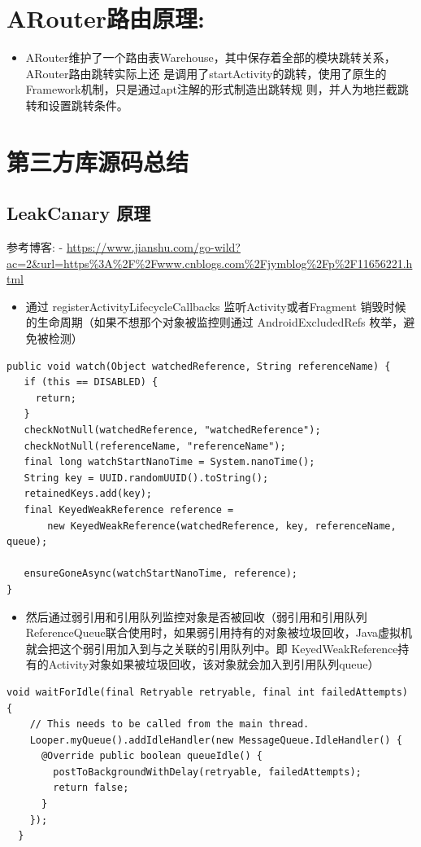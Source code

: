 \documentclass[9pt, b5paper]{article}
\begin{document}
\section{ARouter路由原理:}
\label{sec-8}
\begin{itemize}
\item ARouter维护了一个路由表Warehouse，其中保存着全部的模块跳转关系，ARouter路由跳转实际上还 是调用了startActivity的跳转，使用了原生的Framework机制，只是通过apt注解的形式制造出跳转规 则，并人为地拦截跳转和设置跳转条件。
\end{itemize}

\section{第三方库源码总结}
\label{sec-9}
\subsection{LeakCanary 原理}
\label{sec-9-1}
参考博客: - \url{https://www.jianshu.com/go-wild?ac=2&url=https\%3A\%2F\%2Fwww.cnblogs.com\%2Fjymblog\%2Fp\%2F11656221.html}
\begin{itemize}
\item 通过 registerActivityLifecycleCallbacks 监听Activity或者Fragment 销毁时候的生命周期（如果不想那个对象被监控则通过 AndroidExcludedRefs 枚举，避免被检测）
\end{itemize}
\begin{verbatim}
public void watch(Object watchedReference, String referenceName) {
   if (this == DISABLED) {
     return;
   }
   checkNotNull(watchedReference, "watchedReference");
   checkNotNull(referenceName, "referenceName");
   final long watchStartNanoTime = System.nanoTime();
   String key = UUID.randomUUID().toString();
   retainedKeys.add(key);
   final KeyedWeakReference reference =
       new KeyedWeakReference(watchedReference, key, referenceName, queue);

   ensureGoneAsync(watchStartNanoTime, reference);
}
\end{verbatim}
\begin{itemize}
\item 然后通过弱引用和引用队列监控对象是否被回收（弱引用和引用队列ReferenceQueue联合使用时，如果弱引用持有的对象被垃圾回收，Java虚拟机就会把这个弱引用加入到与之关联的引用队列中。即 KeyedWeakReference持有的Activity对象如果被垃圾回收，该对象就会加入到引用队列queue）
\end{itemize}
\begin{verbatim}
void waitForIdle(final Retryable retryable, final int failedAttempts) {
    // This needs to be called from the main thread.
    Looper.myQueue().addIdleHandler(new MessageQueue.IdleHandler() {
      @Override public boolean queueIdle() {
        postToBackgroundWithDelay(retryable, failedAttempts);
        return false;
      }
    });
  }
\end{verbatim}
\end{document}
